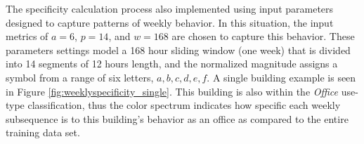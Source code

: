 The specificity calculation process also implemented using input parameters designed to capture patterns of weekly behavior. In this situation, the input metrics of $a=6$, $p=14$, and $w=168$ are chosen to capture this behavior. These parameters settings model a 168 hour sliding window (one week) that is divided into 14 segments of 12 hours length, and the normalized magnitude assigns a symbol from a range of six letters, $a,b,c,d,e,f$. A single building example is seen in Figure \ref{fig:weeklyspecificity_single}. This building is also within the \emph{Office} use-type classification, thus the color spectrum indicates how specific each weekly subsequence is to this building's behavior as an office as compared to the entire training data set.